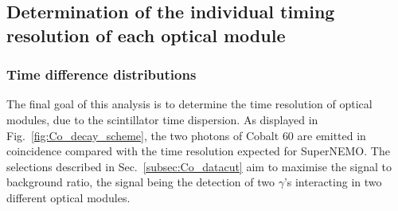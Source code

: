 









\subsection{Determination of the individual timing resolution of each optical module}


\subsubsection*{Time difference distributions}

The final goal of this analysis is to determine the time resolution of optical modules, due to the scintillator time dispersion.
As displayed in Fig.~\ref{fig:Co_decay_scheme}, the two photons of Cobalt $60$ are emitted in coincidence compared with the time resolution expected for SuperNEMO.
The selections described in Sec.~\ref{subsec:Co_datacut} aim to maximise the signal to background ratio, the signal being the detection of two $\gamma$'s interacting in two different optical modules.


